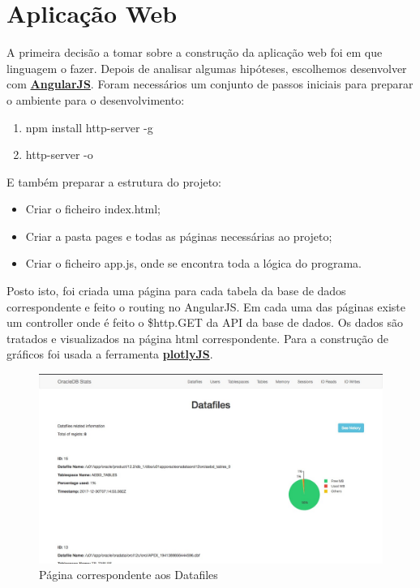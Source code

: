 \chapter*{Aplicação Web}

A primeira decisão a tomar sobre a construção da aplicação web foi em que linguagem o fazer. Depois de analisar algumas hipóteses, escolhemos desenvolver com \textbf{\href{https://angularjs.org/}{AngularJS}}.
\newline Foram necessários um conjunto de passos iniciais para preparar o ambiente para o desenvolvimento:

\begin{enumerate}
    \item npm install http-server -g
    \item http-server -o
\end{enumerate}

E também preparar a estrutura do projeto:

\begin{itemize}
    \item Criar o ficheiro index.html;
    \item Criar a pasta pages e todas as páginas necessárias ao projeto;
    \item Criar o ficheiro app.js, onde se encontra toda a lógica do programa.
\end{itemize}

Posto isto, foi criada uma página para cada tabela da base de dados correspondente e feito o routing no AngularJS. Em cada uma das páginas existe um controller onde é feito o \$http.GET da API da base de dados. Os dados são tratados e visualizados na página html correspondente.
\newline Para a construção de gráficos foi usada a ferramenta \textbf{\href{https://plot.ly/javascript/}{plotlyJS}}.

\begin{figure}[h!]
 \includegraphics[width=\linewidth]{tex/img/home.jpg}
    \caption{Página correspondente aos Datafiles} 
\end{figure}

